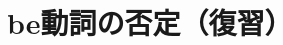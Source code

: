 \documentclass[aspectratio=169,xcolor={dvipsnames,table}]{beamer}
\newcommand{\myaudio}[1]{\href{#1}{\faVolumeUp}}
\begin{document}
\section{be動詞の否定（復習）}
%
%
\end{document}
